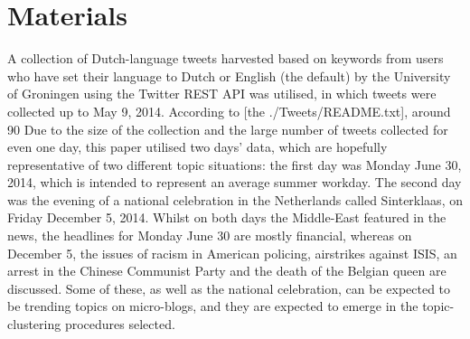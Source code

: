 \documentclass{article}
\begin{document}
  \section{Materials}
A collection of Dutch-language tweets harvested based on keywords from users who have set their language to Dutch or English (the default) by the University of Groningen using the Twitter REST API was utilised, in which tweets were collected up to May 9, 2014. According to [the ./Tweets/README.txt], around 90%
Due to the size of the collection and the large number of tweets collected for even one day, this paper utilised two days’ data, which are hopefully representative of two different topic situations: the first day was Monday June 30, 2014, which is intended to represent an average summer workday. The second day was the evening of a national celebration in the Netherlands called Sinterklaas, on Friday December 5, 2014. Whilst on both days the Middle-East featured in the news, the headlines for Monday June 30 are mostly financial, whereas on December 5, the issues of racism in American policing, airstrikes against ISIS, an arrest in the Chinese Communist Party and the death of the Belgian queen are discussed. Some of these, as well as the national celebration, can be expected to be trending topics on micro-blogs, and they are expected to emerge in the topic-clustering procedures selected.
\end{document}
